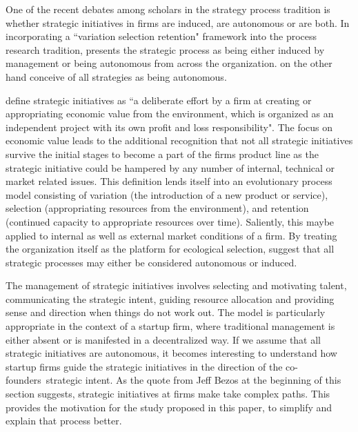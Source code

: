 \documentclass[12pt,letterpaper]{article}
\begin{document}
One of the recent  debates among scholars in the strategy process tradition is  whether strategic initiatives in firms are induced, are autonomous or are both. In incorporating a ``variation selection retention" framework into the process research tradition, \cite{Burgelman1991} presents the strategic process as being either induced by management or being autonomous from across the organization. \cite{Lovas2000} on the other hand conceive of all strategies as being autonomous.\par

\cite{Lovas2000} define strategic initiatives as ``a deliberate effort by a firm at creating or appropriating economic value from the environment, which is organized as an independent project with its own profit and loss responsibility". The focus on economic value leads to the additional recognition that not all strategic initiatives survive the initial stages to become a part of the firm\textquotesingle s product line as the strategic initiative could be hampered by any number of internal, technical or market related issues. This definition lends itself into an evolutionary process model consisting of variation (the introduction of a new product or service), selection (appropriating resources from the environment), and retention (continued capacity to appropriate resources over time). Saliently, this maybe applied to internal as well as external market conditions of a firm. By treating the organization itself as the platform for ecological selection, \cite{Lovas2000} suggest that all strategic processes may either be considered autonomous or induced. \par

The management of strategic initiatives involves selecting and motivating talent, communicating the strategic intent, guiding resource allocation and providing sense and direction when things do not work out. The \cite{Lovas2000} model is particularly appropriate in the context of a startup firm, where traditional management is either absent or is manifested in a decentralized way. If we assume that all strategic initiatives are autonomous, it becomes interesting to understand how startup firms guide the strategic initiatives in the direction of the co-founders\textquotesingle \ strategic intent. As the quote from Jeff Bezos at the beginning of this section suggests, strategic initiatives at firms make take complex paths. This provides the motivation for the study proposed in this paper, to simplify and explain that process better.\par
\end{document}
